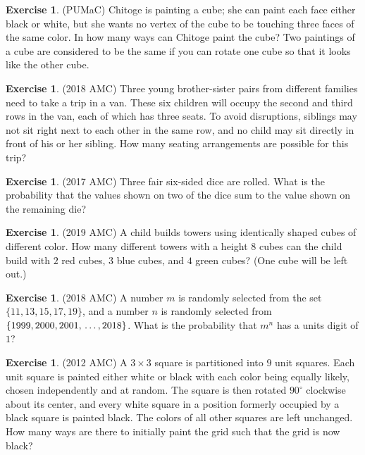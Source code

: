 \documentclass[letterpaper]{article}
\theoremstyle{remark}
\theoremstyle{definition}
\newtheorem{exercise}[thm]{Exercise}
\begin{document}
\begin{exercise}
(PUMaC) Chitoge is painting a cube; she can paint each face either black or white, but she wants no vertex of the cube to be touching three faces of the same color. In how many ways can Chitoge paint the cube? Two paintings of a cube are considered to be the same if you can rotate one cube so that it looks like the other cube.
\end{exercise}

\begin{exercise}
(2018 AMC) Three young brother-sister pairs from different families need to take a trip in a van. These six children will occupy the second and third rows in the van, each of which has three seats. To avoid disruptions, siblings may not sit right next to each other in the same row, and no child may sit directly in front of his or her sibling. How many seating arrangements are possible for this trip?
\end{exercise}

\begin{exercise}
(2017 AMC) Three fair six-sided dice are rolled. What is the probability that the values shown on two of the dice sum to the value shown on the remaining die?
\end{exercise}

\begin{exercise}
(2019 AMC) A child builds towers using identically shaped cubes of different color. How many different towers with a height $8$ cubes can the child build with $2$ red cubes, $3$ blue cubes, and $4$ green cubes? (One cube will be left out.)
\end{exercise}

\begin{exercise}
(2018 AMC) A number $m$ is randomly selected from the set $\{11,13,15,17,19\}$, and a number $n$ is randomly selected from $\{1999,2000,2001,\newline \ldots,2018\}$. What is the probability that $m^n$ has a units digit of $1$?
\end{exercise}

\begin{exercise}
(2012 AMC) A $3\times3$ square is partitioned into $9$ unit squares. Each unit square is painted either white or black with each color being equally likely, chosen independently and at random. The square is then rotated $90^\circ$ clockwise about its center, and every white square in a position formerly occupied by a black square is painted black. The colors of all other squares are left unchanged. How many ways are there to initially paint the grid such that the grid is now black?
\end{exercise}
\end{document}
